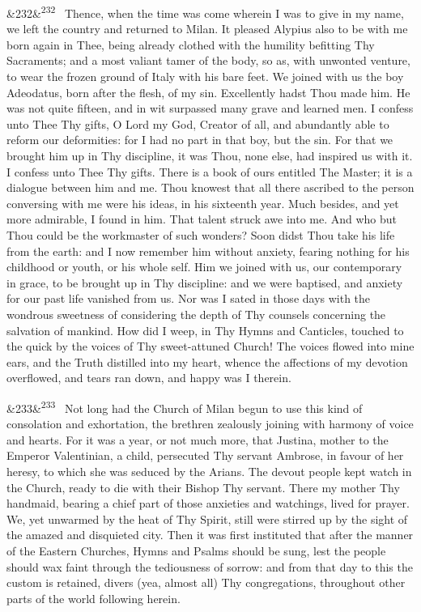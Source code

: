 \documentclass[12pt]{article}
\newcommand{\para}[1][]{\par\noindent\ifx&#1&\else\textsuperscript{\footnotesize #1}~\fi}
\begin{document}
\para[232] Thence, when the time was come wherein I was to give in my name, we left the country and returned to Milan. It pleased Alypius also to be with me born again in Thee, being already clothed with the humility befitting Thy Sacraments; and a most valiant tamer of the body, so as, with unwonted venture, to wear the frozen ground of Italy with his bare feet. We joined with us the boy Adeodatus, born after the flesh, of my sin. Excellently hadst Thou made him. He was not quite fifteen, and in wit surpassed many grave and learned men. I confess unto Thee Thy gifts, O Lord my God, Creator of all, and abundantly able to reform our deformities: for I had no part in that boy, but the sin. For that we brought him up in Thy discipline, it was Thou, none else, had inspired us with it. I confess unto Thee Thy gifts. There is a book of ours entitled The Master; it is a dialogue between him and me. Thou knowest that all there ascribed to the person conversing with me were his ideas, in his sixteenth year. Much besides, and yet more admirable, I found in him. That talent struck awe into me. And who but Thou could be the workmaster of such wonders? Soon didst Thou take his life from the earth: and I now remember him without anxiety, fearing nothing for his childhood or youth, or his whole self. Him we joined with us, our contemporary in grace, to be brought up in Thy discipline: and we were baptised, and anxiety for our past life vanished from us. Nor was I sated in those days with the wondrous sweetness of considering the depth of Thy counsels concerning the salvation of mankind. How did I weep, in Thy Hymns and Canticles, touched to the quick by the voices of Thy sweet-attuned Church! The voices flowed into mine ears, and the Truth distilled into my heart, whence the affections of my devotion overflowed, and tears ran down, and happy was I therein.

\para[233] Not long had the Church of Milan begun to use this kind of consolation and exhortation, the brethren zealously joining with harmony of voice and hearts. For it was a year, or not much more, that Justina, mother to the Emperor Valentinian, a child, persecuted Thy servant Ambrose, in favour of her heresy, to which she was seduced by the Arians. The devout people kept watch in the Church, ready to die with their Bishop Thy servant. There my mother Thy handmaid, bearing a chief part of those anxieties and watchings, lived for prayer. We, yet unwarmed by the heat of Thy Spirit, still were stirred up by the sight of the amazed and disquieted city. Then it was first instituted that after the manner of the Eastern Churches, Hymns and Psalms should be sung, lest the people should wax faint through the tediousness of sorrow: and from that day to this the custom is retained, divers (yea, almost all) Thy congregations, throughout other parts of the world following herein.
\end{document}
